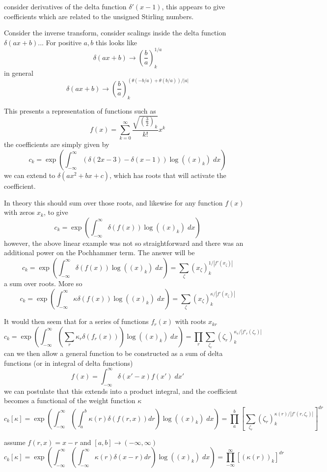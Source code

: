 \documentclass{article}
\begin{document}
consider derivatives of the delta function $\delta'(x-1)$, this appears to give coefficients which are related to the unsigned Stirling numbers.

Consider the inverse transform, consider scalings inside the delta function $\delta(ax +b)$...
For positive $a,b$ this looks like 
$$
\delta (ax +b) \to (\frac{b}{a})_k^{1/a}
$$
in general
$$
\delta (ax +b) \to (\frac{b}{a})_k^{(\theta(-b/a)+\theta(b/a))/|a|}
$$

This presents a representation of functions such as 
$$
f(x) = \sum_{k=0}^\infty \frac{\sqrt{(\frac{3}{2})_k}}{k!} x^k
$$
the coefficients are simply given by 
$$
c_k = \exp\left(\int_{-\infty}^\infty (\delta(2x-3)-\delta(x-1)) \log((x)_k) \; dx \right)
$$
we can extend to $\delta(a x^2 + b x + c)$, which has roots that will activate the coefficient.

In theory this should sum over those roots, and likewise for any function $f(x)$ with zeros $x_k$, to give 
$$
c_k = \exp\left(\int_{-\infty}^\infty \delta(f(x)) \log((x)_k) \; dx \right)
$$
however, the above linear example was not so straightforward and there was an additional power on the Pochhammer term. The answer will be
$$
c_k = \exp\left(\int_{-\infty}^\infty \delta(f(x)) \log((x)_k) \; dx \right) = \sum_{\zeta} (x_\zeta)_k^{1/|f'(x_\zeta)|}
$$
a sum over roots. More so
$$
c_k = \exp\left(\int_{-\infty}^\infty \kappa \delta(f(x)) \log((x)_k) \; dx \right) = \sum_{\zeta} (x_\zeta)_k^{\kappa/|f'(x_\zeta)|}
$$

It would then seem that for a series of functions $f_r(x)$ with roots $x_{kr}$
$$
c_k = \exp\left(\int_{-\infty}^\infty \left(\sum_r \kappa_r \delta(f_r(x))\right) \log((x)_k) \; dx \right) = \prod_r \sum_{\zeta_r} (\zeta_r)_k^{\kappa_r/|f'_r(\zeta_r)|}
$$
can we then allow a general function to be constructed as a sum of delta functions (or in integral of delta functions)
$$
f(x) = \int_{-\infty}^\infty \delta(x'-x)f(x') \; dx'
$$
we can postulate that this extends into a product integral, and the coefficient becomes a functional of the weight function $\kappa$
$$
c_k[\kappa] = \exp\left(\int_{-\infty}^\infty \left(\int_a^b \kappa(r) \delta(f(r,x)) dr\right) \log((x)_k) \; dx \right) = \prod_{a}^b \left[ \sum_{\zeta_r} (\zeta_r)_k^{\kappa(r)/|f'(r,\zeta_r)|} \right]^{dr}
$$

assume $f(r,x) = x-r$ and $[a,b] \to (-\infty,\infty)$
$$
c_k[\kappa] = \exp\left(\int_{-\infty}^\infty \left(\int_{-\infty}^\infty \kappa(r) \delta(x-r) dr\right) \log((x)_k) \; dx \right) = \prod_{-\infty}^\infty \left[ (\kappa(r))_k \right]^{dr}
$$
\end{document}
